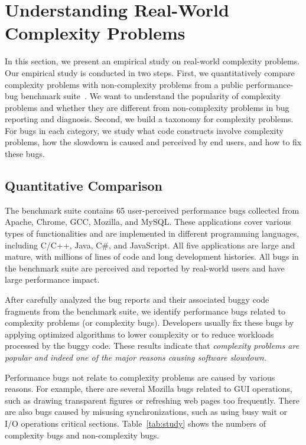 \section{Understanding Real-World Complexity Problems}
\label{sec:study}



In this section, we present an empirical study on real-world 
complexity problems. Our empirical study is conducted in two steps.
First, we quantitatively compare complexity problems with non-complexity problems
from a public performance-bug benchmark suite~\cite{PerfBug,SongOOPSLA2014,ldoctor}. 
We want to understand the popularity of complexity problems 
and whether they are different from non-complexity 
problems in bug reporting and diagnosis. 
Second, we build a taxonomy for complexity problems. 
For bugs in each category, 
we study what code constructs involve complexity problems,
how the slowdown is caused and perceived by end users, 
and how to fix these bugs. 


\subsection{Quantitative Comparison}
\label{sec:compare}

The benchmark suite contains 65 user-perceived performance bugs 
collected from  Apache, Chrome, GCC, Mozilla, and MySQL. 
These applications cover various types of functionalities and are implemented 
in different programming languages, including C/C++, Java, C\#, and JavaScript. 
All  five applications are large and mature, 
with millions of lines of code and long development histories. 
All bugs in the benchmark suite are perceived and reported by real-world users
and have large performance impact. 

After carefully analyzed the bug reports and their associated buggy code fragments
from the benchmark suite,
we identify \ComBugs performance bugs related to complexity problems (or complexity
bugs). 
Developers usually fix these bugs by applying optimized algorithms to lower complexity
or to reduce workloads processed by the buggy code. 
These results indicate that \emph{complexity problems are popular and 
indeed one of the major reasons causing software slowdown.}

Performance bugs not relate to complexity problems are caused by various reasons.
For example, there are several Mozilla bugs related to GUI operations, 
such as drawing transparent figures or refreshing web pages too frequently. 
There are also bugs caused by misusing synchronizations, 
such as using busy wait or I/O operations critical sections. 
Table~\ref{tab:study} shows the numbers of complexity bugs and non-complexity bugs.

